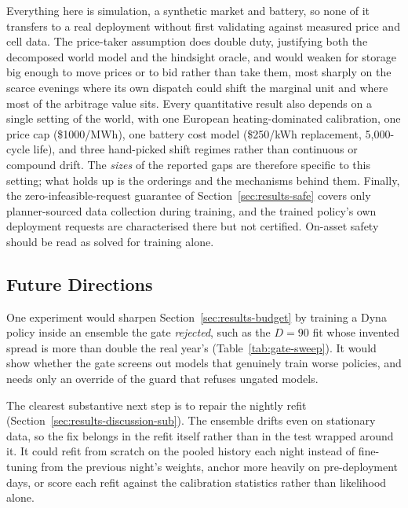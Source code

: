 \documentclass[conference]{IEEEtran}
\begin{document}
Everything here is simulation, a synthetic market and battery, so none of it transfers to a real deployment without first validating against measured price and cell data. The price-taker assumption does double duty, justifying both the decomposed world model and the hindsight oracle, and would weaken for storage big enough to move prices or to bid rather than take them, most sharply on the scarce evenings where its own dispatch could shift the marginal unit and where most of the arbitrage value sits. Every quantitative result also depends on a single setting of the world, with one European heating-dominated calibration, one price cap (\$1000/MWh), one battery cost model (\$250/kWh replacement, 5{,}000-cycle life), and three hand-picked shift regimes rather than continuous or compound drift. The \emph{sizes} of the reported gaps are therefore specific to this setting; what holds up is the orderings and the mechanisms behind them. Finally, the zero-infeasible-request guarantee of Section~\ref{sec:results-safe} covers only planner-sourced data collection during training, and the trained policy's own deployment requests are characterised there but not certified. On-asset safety should be read as solved for training alone.

\subsection{Future Directions}
\label{sec:future-work}

One experiment would sharpen Section~\ref{sec:results-budget} by training a Dyna policy inside an ensemble the gate \emph{rejected}, such as the $D{=}90$ fit whose invented spread is more than double the real year's (Table~\ref{tab:gate-sweep}). It would show whether the gate screens out models that genuinely train worse policies, and needs only an override of the guard that refuses ungated models.

The clearest substantive next step is to repair the nightly refit (Section~\ref{sec:results-discussion-sub}). The ensemble drifts even on stationary data, so the fix belongs in the refit itself rather than in the test wrapped around it. It could refit from scratch on the pooled history each night instead of fine-tuning from the previous night's weights, anchor more heavily on pre-deployment days, or score each refit against the calibration statistics rather than likelihood alone.
\end{document}
